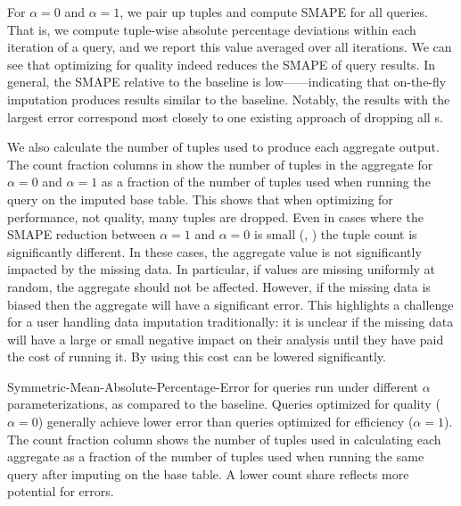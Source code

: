 For $\alpha=0$ and $\alpha=1$, we pair up tuples and compute SMAPE for all queries. That is,
we compute tuple-wise absolute percentage deviations within each iteration of a query, and
we report this value averaged over all iterations.  We
can see that optimizing for quality indeed reduces the SMAPE of query results.  In general, the SMAPE relative 
to the baseline is low------indicating that on-the-fly imputation produces results similar to the baseline. Notably, the results with the largest error correspond
most closely to one existing approach of dropping all \nullv{}s.

We also calculate the number of tuples used to produce each aggregate output.
The count fraction columns in  show the number of tuples in the aggregate for $\alpha = 0$ and $\alpha = 1$ as a fraction of the number of tuples used when running the query on the imputed base table.
This shows that when optimizing for performance, not quality, many tuples are dropped.
Even in cases where the SMAPE reduction between $\alpha = 1$ and $\alpha = 0$ is small (, ) the tuple count is significantly different.
In these cases, the aggregate value is not significantly impacted by the missing data. In particular, if values are missing uniformly at random,
the aggregate should not be affected.
However, if the missing data is biased then the aggregate will have a significant error.
This highlights a challenge for a user handling data imputation traditionally: it is unclear if the missing data will have a large or small negative impact on their analysis until they have paid the cost of running it.
By using \ProjectName{} this cost can be lowered significantly.


\begin{table}
\centering

\caption{Symmetric-Mean-Absolute-Percentage-Error for queries run under different $\alpha$ parameterizations, as compared to the baseline.
Queries optimized
    for quality ($\alpha=0$) generally achieve lower error than queries optimized for
    efficiency ($\alpha=1$). The count fraction column shows the number of tuples used in calculating each aggregate
     as a fraction of the number of tuples used when running the same query after imputing on the base table.
    A lower count share reflects more potential for errors.}
\label{table:smape}
\end{table}

